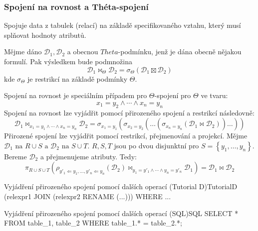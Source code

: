 \subsubsection{Spojení na rovnost a Théta-spojení}
Spojuje data z tabulek (relací) na základě specifikovaného vztahu, který musí splňovat hodnoty atributů.

Mějme dáno $\mathcal{D}_{1}, \mathcal{D}_{2}$ a obecnou $Theta$-podmínku, jenž je dána obecně nějakou formulí. Pak výsledkem bude podmnožina
$$
\mathcal{D}_{1} \Join_{\Theta} \mathcal{D}_{2} = \sigma_{\Theta} (\mathcal{D}_{1} \boxtimes \mathcal{D}_{2})
$$
kde $\sigma_{\Theta}$ je restrikcí na základě podmínky $\Theta$.

Spojení na rovnost je speciálním případem pro $\Theta$-spojení pro $\Theta$ ve tvaru:
$$
x_{1} = y_{2} \land \cdots \land x_{n} = y_{n} 
$$
Spojení na rovnost lze vyjádřit pomocí přirozeného spojení a restrikcí následovně:
$$
\mathcal{D}_{1} \Join_{x_{1} = y_{1} \land \cdots \land x_{n} = y_{n}} \mathcal{D}_{2} = \sigma_{x_{1} = y_{1}} (\sigma_{x_{2} = y_{2}} (\ldots (\sigma_{x_{n} = y_{n}}(\mathcal{D}_{1} \Join \mathcal{D}_{2}))\dots))
$$
Přirozené spojení lze vyjádřit pomocí restrikcí, přejmenování a projekcí. Mějme $\mathcal{D}_{1}\text{ na } R \cup S \text{ a } \mathcal{D}_{2} \text{ na } S \cup T$. $R, S, T$ jsou po dvou disjunktní pro $S = \left\{ y_{1}, \ldots, y_{n} \right\}$. Bereme $\mathcal{D}_{2}$ a přejmenujeme atributy. Tedy:
$$
\pi_{R \cup S \cup T} (\rho_{y'_{1} \Leftarrow y_{1}, \ldots, y'_{n} \Leftarrow y_{n}} (\mathcal{D}_{2}) \Join_{y_{1} = y'_{1} \land \cdots \land y_{n} = y'_{n}} \mathcal{D}_{1}) = \mathcal{D}_{1} \Join \mathcal{D}_{2}
$$
\begin{upcode}{Vyjádření přirozeného spojení pomocí dalších operací (Tutorial D)}{}{TutorialD}
(relexpr1 JOIN (relexpr2 RENAME (...))) WHERE ...
\end{upcode}
\begin{upcode}{Vyjádření přirozeného spojení pomocí dalších operací (SQL)}{}{SQL}
SELECT * FROM table_1, table_2 WHERE table_1.* = table_2.*;
\end{upcode}